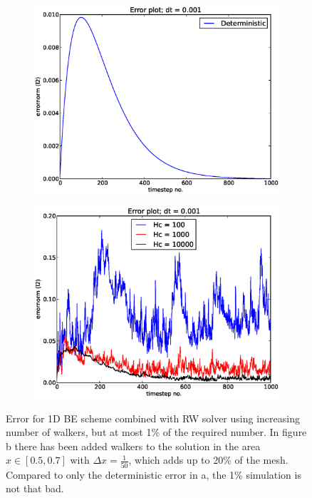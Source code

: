 \begin{figure}[H]
\centering
\begin{subfigure}[b]{0.48\textwidth}
\includegraphics[width=\textwidth]{Figures/errorplot_BE1D_deterministic.eps}
\caption{}
\label{errorplot_BE1D_noWalk}
\end{subfigure}
\begin{subfigure}[b]{0.48\textwidth}
\includegraphics[width=\textwidth]{Figures/errorplot_BE1D_few_walkes.eps}
\caption{}
 \label{errorplot_BE1D_Walk}
\end{subfigure}
\caption[Error for 1D BE scheme with to few walkers]{Error for 1D BE scheme combined with RW solver using increasing number of walkers, but at most 1\% of the required number. In figure b there has been added walkers to the solution in the area $x\in[0.5,0.7]$ with $\Delta x = \frac{1}{50}$, which adds up to 20\% of the mesh. Compared to only the deterministic error in a, the 1\% simulation is not that bad.}
\label{errorplot_BE1D_first}
\end{figure}

